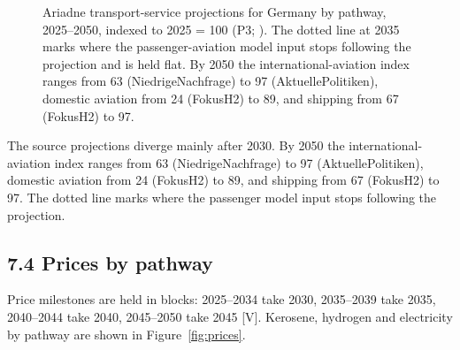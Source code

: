 \documentclass[11pt,a4paper]{article}
\begin{document}
\begin{figure}[htbp]
\caption{Ariadne transport-service projections for Germany by pathway, 2025--2050, indexed to 2025 = 100 (P3; \citealp{luderer2025}). The dotted line at 2035 marks where the passenger-aviation model input stops following the projection and is held flat. By 2050 the international-aviation index ranges from 63 (NiedrigeNachfrage) to 97 (AktuellePolitiken), domestic aviation from 24 (FokusH2) to 89, and shipping from 67 (FokusH2) to 97.}
\label{fig:demand}
\end{figure}

The source projections diverge mainly after 2030. By 2050 the international-aviation index ranges from 63 (NiedrigeNachfrage) to 97 (AktuellePolitiken), domestic aviation from 24 (FokusH2) to 89, and shipping from 67 (FokusH2) to 97. The dotted line marks where the passenger model input stops following the projection.

\subsection*{7.4 Prices by pathway}

Price milestones are held in blocks: 2025–2034 take 2030, 2035–2039 take 2035, 2040–2044 take 2040, 2045–2050 take 2045 [V]. Kerosene, hydrogen and electricity by pathway are shown in Figure~\ref{fig:prices}.
\end{document}
